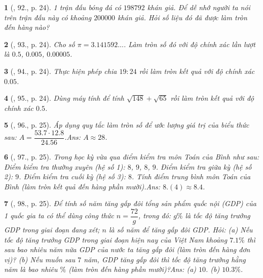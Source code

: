 \documentclass{article}
\newtheorem{baitoan}{}
\begin{document}
\begin{baitoan}[\cite{Tuyen_Toan_7}, 92., p. 24]
	1 trận đấu bóng đá có $198 792$ khán giả. Để dễ nhớ người ta nói trên trận đấu này có khoảng $200000$ khán giả. Hỏi số liệu đó đã được làm tròn đến hàng nào?
\end{baitoan}

\begin{baitoan}[\cite{Tuyen_Toan_7}, 93., p. 24]
	Cho số $\pi = 3.141592\ldots$. Làm tròn số đó với độ chính xác lần lượt là $0.5$, $0.005$, $0.00005$.
\end{baitoan}

\begin{baitoan}[\cite{Tuyen_Toan_7}, 94., p. 24]
	Thực hiện phép chia $19:24$ rồi làm tròn kết quả với độ chính xác $0.05$.
\end{baitoan}

\begin{baitoan}[\cite{Tuyen_Toan_7}, 95., p. 24]
	Dùng máy  tính để tính $\sqrt{148} + \sqrt{65}$ rồi làm tròn kết quả với độ chính xác $0.5$.
\end{baitoan}

\begin{baitoan}[\cite{Tuyen_Toan_7}, 96., p. 25]
	Áp dụng quy tắc làm tròn số để ước lượng giá trị của biểu thức sau: $A = \dfrac{53.7\cdot 12.8}{24.56}$.\hfill{\sf Ans:} $A\approx 28$.
\end{baitoan}

\begin{baitoan}[\cite{Tuyen_Toan_7}, 97., p. 25]
	Trong học kỳ vừa qua điểm kiểm tra môn Toán của Bình như sau: Điểm kiểm tra thường xuyên (hệ số 1): $8$, $9$, $8$, $9$. Điểm kiểm tra giữa kỳ (hệ số 2): $9$. Điểm kiểm tra cuối kỳ (hệ số 3): $8$. Tính điểm trung bình môn Toán của Bình (làm tròn kết quả đến hàng phần mười).\hfill{\sf Ans:} $8.(4)\approx8.4$.
\end{baitoan}

\begin{baitoan}[\cite{Tuyen_Toan_7}, 98., p. 25]
	Để tính số năm tăng gấp đôi tổng sản phẩm quốc nội (GDP) của 1 quốc gia ta có thể dùng công thức $n = \dfrac{72}{g}$, trong đó: $g\%$ là {\rm tốc độ tăng trưởng GDP} trong giai đoạn đang xét; $n$ là số năm để tăng gấp đôi GDP. Hỏi: (a) Nếu tốc độ tăng trưởng GDP trong giai đoạn hiện nay của Việt Nam khoảng $7.1\%$ thì sau bao nhiêu năm nữa GDP của nước ta tăng gấp đôi (làm tròn đến hàng đơn vị)? (b) Nếu muốn sau $7$ năm, GDP tăng gấp đôi thì tốc độ tăng trưởng hằng năm là bao nhiêu $\%$ (làm tròn đến hàng phần mười)?\hfill{\sf Ans:} (a) $10$. (b) $10.3\%$.
\end{baitoan}
\end{document}
